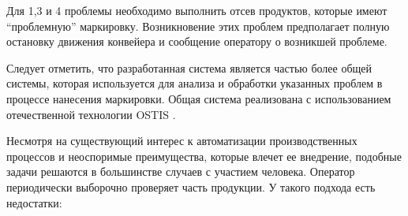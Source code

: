 Для 1,3 и 4 проблемы необходимо выполнить отсев продуктов, которые имеют ``проблемную'' маркировку. Возникновение этих проблем предполагает полную остановку движения конвейера и сообщение оператору о возникшей проблеме.

Следует отметить, что разработанная система является частью более общей системы, которая используется для анализа и обработки указанных проблем в процессе нанесения маркировки. Общая система реализована с использованием отечественной технологии OSTIS \cite[c.~15]{Golenkov2023}.



Несмотря на существующий интерес к автоматизации производственных процессов и неоспоримые преимущества, которые влечет ее внедрение, подобные задачи решаются в большинстве случаев с участием человека. Оператор периодически выборочно проверяет часть продукции. У такого подхода есть недостатки:

